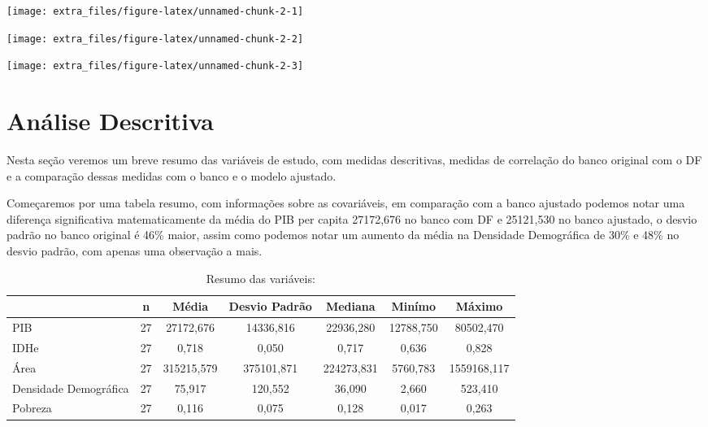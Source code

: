 \documentclass[
]{article}
\begin{document}
\begin{center}\texttt{[image: extra\_files/figure-latex/unnamed-chunk-2-1]} \end{center}

\begin{center}\texttt{[image: extra\_files/figure-latex/unnamed-chunk-2-2]} \end{center}

\begin{center}\texttt{[image: extra\_files/figure-latex/unnamed-chunk-2-3]} \end{center}

\section{Análise Descritiva}

Nesta seção veremos um breve resumo das variáveis de estudo, com medidas descritivas, medidas de correlação do banco original com o DF e a comparação dessas medidas com o banco e o modelo ajustado.

Começaremos por uma tabela resumo, com informações sobre as covariáveis, em comparação com a banco ajustado podemos notar uma diferença significativa matematicamente da média do PIB per capita 27172,676 no banco com DF e 25121,530 no banco ajustado, o desvio padrão no banco original é 46\% maior, assim como podemos notar um aumento da média na Densidade Demográfica de 30\% e 48\% no desvio padrão, com apenas uma observação a mais.

\begin{table}[H]

\caption{\label{tab:unnamed-chunk-3}Resumo das variáveis: }
\centering
\begin{tabular}[t]{l|c|c|c|c|c|c}
\hline
  & n & Média & Desvio Padrão & Mediana & Minímo & Máximo\\
\hline
PIB & 27 & 27172,676 & 14336,816 & 22936,280 & 12788,750 & 80502,470\\
\hline
IDHe & 27 & 0,718 & 0,050 & 0,717 & 0,636 & 0,828\\
\hline
Área & 27 & 315215,579 & 375101,871 & 224273,831 & 5760,783 & 1559168,117\\
\hline
Densidade Demográfica & 27 & 75,917 & 120,552 & 36,090 & 2,660 & 523,410\\
\hline
Pobreza & 27 & 0,116 & 0,075 & 0,128 & 0,017 & 0,263\\
\hline
\end{tabular}
\end{table}
\end{document}
